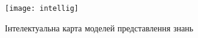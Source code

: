 \begin{landscape}

\begin{figure}[H]
    \centering
        \texttt{[image: intellig]}
    \caption{Інтелектуальна карта моделей представлення знань}
    \label{fig:intellig}
\end{figure}

\end{landscape}
